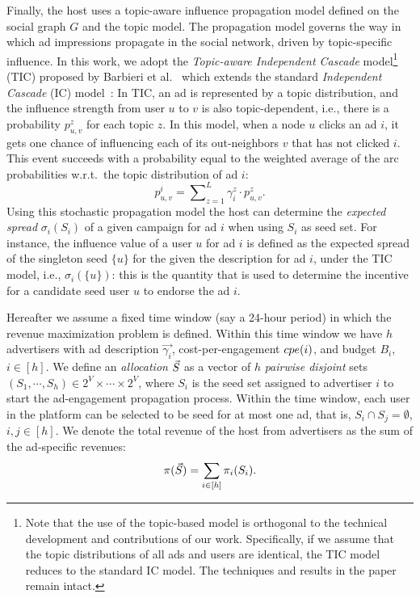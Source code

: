 Finally, the host uses a topic-aware influence propagation model defined on the social graph $G$ and the topic model.
The propagation model governs the way in which ad impressions propagate in the social network, driven by topic-specific influence.
In this work, we adopt the \emph{Topic-aware Independent Cascade} model\footnote{\scriptsize
Note that the use of the topic-based model is orthogonal to the technical development and contributions of our work. Specifically, if we assume that the topic distributions of all ads and users are identical, the TIC model reduces to the standard IC model. The techniques and results in the paper remain intact.
} (TIC) proposed by Barbieri et al.~\cite{BarbieriBM12} which extends the standard \emph{Independent Cascade} (IC) model~\cite{kempe03}: In TIC, an ad is represented by a topic distribution, and the influence strength from user $u$ to $v$ is also topic-dependent, i.e., there is a probability $p_{u,v}^z$ for each topic $z$.
In this model, when a node $u$ clicks an ad $i$, it gets one chance of influencing each of its out-neighbors $v$ that has not clicked $i$. This event succeeds with a probability equal to the weighted average of the arc probabilities w.r.t.\ the topic distribution of ad $i$:
\begin{equation}\label{eq:tic}
	p^i_{u,v} = \sum\nolimits_{z = 1}^L\gamma_i^z \cdot p_{u,v}^z.
\end{equation}
Using this stochastic propagation model the host can determine the \emph{expected spread} $\sigma_i(S_i)$ of a given campaign for ad $i$ when using $S_i$ as seed set.
For instance, the influence value of a user $u$ for ad $i$ is defined as the expected spread of the singleton seed $\{u\}$ for the given the description for ad $i$,  under the TIC model, i.e., $\sigma_i(\{u\})$: this is the quantity that is used to determine the incentive for a candidate seed user $u$ to endorse the ad $i$.


Hereafter we assume a fixed time window (say a 24-hour period) in which the revenue maximization problem is defined.
Within this time window we have $h$ advertisers with ad description  $\vec{\gamma_i}$, cost-per-engagement $cpe({i})$, and budget $B_i$, $i \in [h]$. We define an \emph{allocation} $\vec{S}$ as a vector of $h$ \emph{pairwise disjoint} sets $(S_1, \cdots, S_h) \in 2^V \times \cdots \times 2^V$, where $S_i$ is the seed set assigned to advertiser $i$ to start the ad-engagement propagation process. Within the time window, each user in the platform can be selected to be seed for at most one ad, that is, $S_i \cap S_j = \emptyset$, $i,j \in [h]$. We denote the total revenue of the host from advertisers as the sum of the  ad-specific revenues:
$$
 \pi(\vec{S}) =  \sum_{i \in [h]} \pi_i(S_i).
$$

